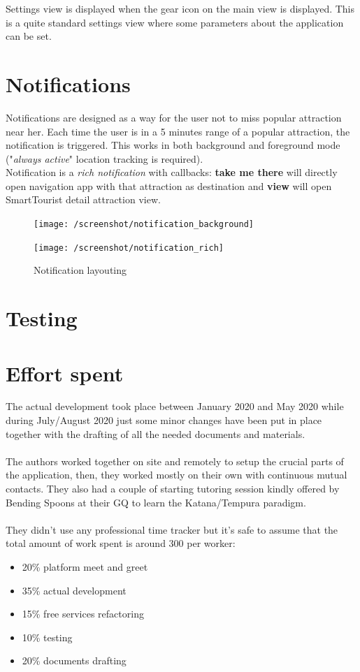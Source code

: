 \documentclass[a4paper, 11pt, parskip=half]{scrreprt}
\theoremstyle{definition}
\begin{document}
Settings view is displayed when the gear icon on the main view is displayed. This is a quite standard settings view where some parameters about the application can be set.


\chapter{Notifications}
Notifications are designed as a way for the user not to miss popular attraction near her. Each time the user is in a 5 minutes range of a popular attraction, the notification is triggered. This works in both background and foreground mode ("\textit{always active}" location tracking is required).
\\Notification is a \textit{rich notification} with callbacks: \textbf{take me there} will directly open navigation app with that attraction as destination and \textbf{view} will open SmartTourist detail attraction view.

\begin{figure}[H]
	\centering
	\begin{minipage}{.5\textwidth}
  	\centering
  	\texttt{[image: /screenshot/notification\_background]}
  	\label{fig:test1}
	\end{minipage}%
	\begin{minipage}{.5\textwidth}
  	\centering
  	\texttt{[image: /screenshot/notification\_rich]}
  	\label{fig:test2}
	\end{minipage}
	\caption{Notification layouting}
\end{figure}

\chapter{Testing}

\chapter{Effort spent}
The actual development took place between January 2020 and May 2020 while during July/August 2020 just some minor changes have been put in place together with the drafting of all the needed documents and materials.
\\\\The authors worked together on site and remotely to setup the crucial parts of the application, then, they worked mostly on their own with continuous mutual contacts. They also had a couple of starting tutoring session kindly offered by Bending Spoons at their GQ to learn the Katana/Tempura paradigm.
\\\\They didn't use any professional time tracker but it's safe to assume that the total amount of work spent is around 300 per worker:
\begin{itemize}
	\item 20\% platform meet and greet
	\item 35\% actual development
	\item 15\% free services refactoring
	\item 10\% testing
	\item 20\% documents drafting
\end{itemize}
\end{document}
